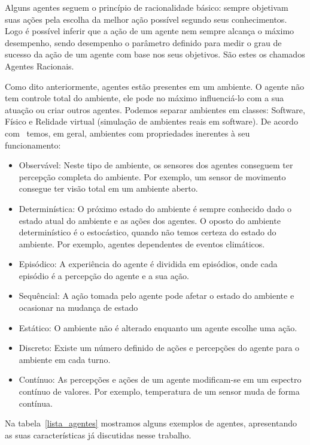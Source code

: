 Alguns agentes seguem o princípio de racionalidade básico: sempre objetivam suas ações pela escolha da melhor ação possível segundo seus conhecimentos. Logo é possível inferir que a ação de um agente nem sempre alcança o máximo desempenho, sendo desempenho o parâmetro definido para medir o grau de sucesso da ação de um agente com base nos seus objetivos. São estes os chamados Agentes Racionais.

Como dito anteriormente, agentes estão presentes em um ambiente. O agente não tem controle total do ambiente, ele pode no máximo influenciá-lo com a sua atuação ou criar outros agentes. Podemos separar ambientes em classes: Software, Físico e Relidade virtual (simulação de ambientes reais em software). De acordo com~\cite{wooldridge04} temos, em geral, ambientes com propriedades inerentes à seu funcionamento:

\begin{itemize}
	\item Observável: Neste tipo de ambiente, os sensores dos agentes conseguem ter percepção completa do ambiente. Por exemplo, um sensor de movimento consegue ter visão total em um ambiente aberto.
	\item Determinística: O próximo estado do ambiente é sempre conhecido dado o estado atual do ambiente e as ações dos agentes. O oposto do ambiente determinístico é o estocástico, quando não temos certeza do estado do ambiente. Por exemplo, agentes dependentes de eventos climáticos.
	\item Episódico: A experiência do agente é dividida em episódios, onde cada episódio é a percepção do agente e a sua ação.
	\item Sequêncial: A ação tomada pelo agente pode afetar o estado do ambiente e ocasionar na mudança de estado
	\item Estático: O ambiente não é alterado enquanto um agente escolhe uma ação.
	\item Discreto: Existe um número definido de ações e percepções do agente para o ambiente em cada turno.
	\item Contínuo: As percepções e ações de um agente modificam-se em um espectro contínuo de valores. Por exemplo, temperatura de um sensor muda de forma contínua.
\end{itemize}

Na tabela~\ref{lista_agentes} mostramos alguns exemplos de agentes, apresentando as suas características já discutidas nesse trabalho.

